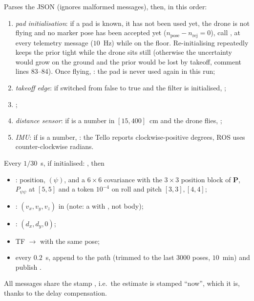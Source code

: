 Parses the JSON (ignores malformed messages), then, in this order:
\begin{enumerate}[nosep]
\item \emph{pad initialisation}: if a pad is known, it has not been used yet, the drone is not flying and no marker pose has
  been accepted yet ($n_{\text{pose}}-n_{\text{rej}}=0$), call , at every
  telemetry message ($10$~Hz) while on the floor. Re-initialising repeatedly keeps the prior tight while the drone sits still
  (otherwise the uncertainty would grow on the ground and the prior would be lost by takeoff, comment lines 83--84). Once
  flying, : the pad is never used again in this run;
\item \emph{takeoff edge}: if  switched from false to true and the filter is initialised, ;
\item {};
\item \emph{distance sensor}: if  is a number in $[15, 400]$~cm and the drone flies, ;
\item \emph{IMU}: if  is a number, : the Tello reports clockwise-positive
  degrees, ROS uses counter-clockwise radians.
\end{enumerate}

Every $1/30$~s, if initialised: , then
\begin{itemize}[nosep]
\item {}: position, $(\psi)$, and a $6\times6$ covariance with the $3\times3$ position block of
  $\mathbf P$, $P_{\psi\psi}$ at $[5,5]$ and a token $10^{-4}$ on roll and pitch $[3,3],[4,4]$;
\item {}: $(v_x,v_y,v_z)$ in  (note: a  with , not body);
\item {}: $(d_x,d_y,0)$;
\item TF $\to$ with the same pose;
\item every $0.2$~s, append to the path (trimmed to the last 3000 poses, $10$~min) and publish .
\end{itemize}
All messages share the stamp , i.e.\ the estimate is stamped ``now'', which it is, thanks to the
delay compensation.

